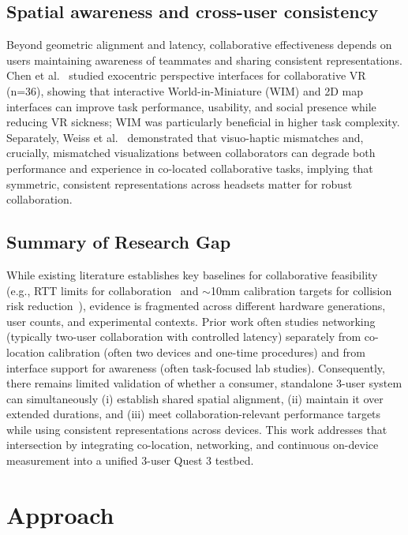 \documentclass[conference]{IEEEtran}
\begin{document}
\subsection{Spatial awareness and cross-user consistency}
Beyond geometric alignment and latency, collaborative effectiveness depends on users maintaining awareness of teammates and sharing consistent representations. Chen et al.~\cite{ChenLei2024Eoep} studied exocentric perspective interfaces for collaborative VR (n=36), showing that interactive World-in-Miniature (WIM) and 2D map interfaces can improve task performance, usability, and social presence while reducing VR sickness; WIM was particularly beneficial in higher task complexity. Separately, Weiss et al.~\cite{WeissYannick2025ItEo} demonstrated that visuo-haptic mismatches and, crucially, mismatched visualizations between collaborators can degrade both performance and experience in co-located collaborative tasks, implying that symmetric, consistent representations across headsets matter for robust collaboration.

\subsection{Summary of Research Gap}
While existing literature establishes key baselines for collaborative feasibility (e.g., RTT limits for collaboration~\cite{VanDammeSam2024Iolo} and $\sim$10mm calibration targets for collision risk reduction~\cite{ReimerDennis2021CfSV}), evidence is fragmented across different hardware generations, user counts, and experimental contexts. Prior work often studies networking (typically two-user collaboration with controlled latency) separately from co-location calibration (often two devices and one-time procedures) and from interface support for awareness (often task-focused lab studies). Consequently, there remains limited validation of whether a consumer, standalone 3-user system can simultaneously (i) establish shared spatial alignment, (ii) maintain it over extended durations, and (iii) meet collaboration-relevant performance targets while using consistent representations across devices. This work addresses that intersection by integrating co-location, networking, and continuous on-device measurement into a unified 3-user Quest 3 testbed.


\section{Approach}
\end{document}
